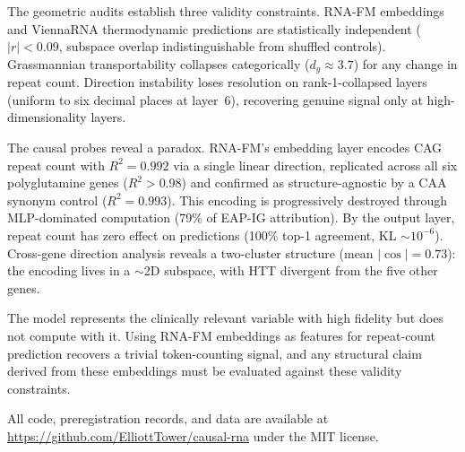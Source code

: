 \documentclass[11pt]{article}
\begin{document}
The geometric audits establish three validity constraints.
RNA-FM embeddings and ViennaRNA thermodynamic predictions are
statistically independent ($|r| < 0.09$, subspace overlap
indistinguishable from shuffled controls). Grassmannian
transportability collapses categorically ($d_g \approx 3.7$) for any
change in repeat count. Direction instability loses resolution on
rank-1-collapsed layers (uniform to six decimal places at layer~6),
recovering genuine signal only at high-dimensionality layers.

The causal probes reveal a paradox. RNA-FM's embedding layer encodes
CAG repeat count with $R^2 = 0.992$ via a single linear direction,
replicated across all six polyglutamine genes ($R^2 > 0.98$) and
confirmed as structure-agnostic by a CAA synonym control ($R^2 =
0.993$). This encoding is progressively destroyed through
MLP-dominated computation (79\% of EAP-IG attribution). By the output
layer, repeat count has zero effect on predictions (100\% top-1
agreement, KL $\sim 10^{-6}$). Cross-gene direction analysis reveals
a two-cluster structure (mean $|\cos| = 0.73$): the encoding lives in
a $\sim$2D subspace, with HTT divergent from the five other genes.

The model represents the clinically relevant variable with high
fidelity but does not compute with it. Using RNA-FM embeddings as
features for repeat-count prediction recovers a trivial
token-counting signal, and any structural claim derived from
these embeddings must be evaluated against these validity constraints.

All code, preregistration records, and data are available at
\url{https://github.com/ElliottTower/causal-rna} under the MIT
license.



% 
\end{document}
